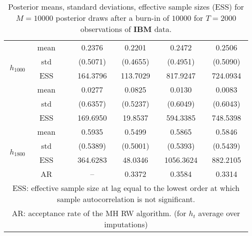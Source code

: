 {\begin{table}
\begin{tabular}{ccc cc cc}
\multirow{4}{*}{$h_{1000}$}   & mean &   & 0.2376  & 0.2201  & 0.2472  & 0.2506  \\ [0.75ex]
 & std &   & (0.5071)  & (0.4655)  & (0.4951)  & (0.5090)  \\ [0.75ex]
 & ESS  &   & 164.3796  & 113.7029  & 817.9247  & 724.0934  \\ [1.3ex] 
\multirow{4}{*}{$h_{1400}$}   & mean &   & 0.0277  & 0.0825  & 0.0130  & 0.0083  \\ [0.75ex]
 & std &   & (0.6357)  & (0.5237)  & (0.6049)  & (0.6043)  \\ [0.75ex]
 & ESS  &   & 169.6950  & 19.8537  & 594.3385  & 748.5398  \\ [1.3ex] 
\multirow{4}{*}{$h_{1800}$}   & mean &   & 0.5935  & 0.5499  & 0.5865  & 0.5846  \\ [0.75ex]
 & std &   & (0.5389)  & (0.5001)  & (0.5393)  & (0.5439)  \\ [0.75ex]
 & ESS  &   & 364.6283  & 48.0346  & 1056.3624  & 882.2105  \\ [1.3ex] 
 & AR & & --  & 0.3372  & 0.3584  & 0.3314 \\ \hline 
\hline 
\multicolumn{7}{p{11cm}}{\footnotesize{ESS: effective sample size at lag equal to the lowest order at which sample autocorrelation is not significant.}}  \\ 
\multicolumn{7}{p{11cm}}{\footnotesize{AR: acceptance rate of the MH RW algorithm. (for $h_{t}$ average over imputations)}}  \\ 
\end{tabular}
 \caption{Posterior means, standard deviations, effective sample sizes (ESS)  for $M=10000$ posterior draws after a burn-in of $10000$ for $T=2000$ observations of \textbf{IBM} data.}
\label{tab:SV_results_IBM}  
\end{table}
}